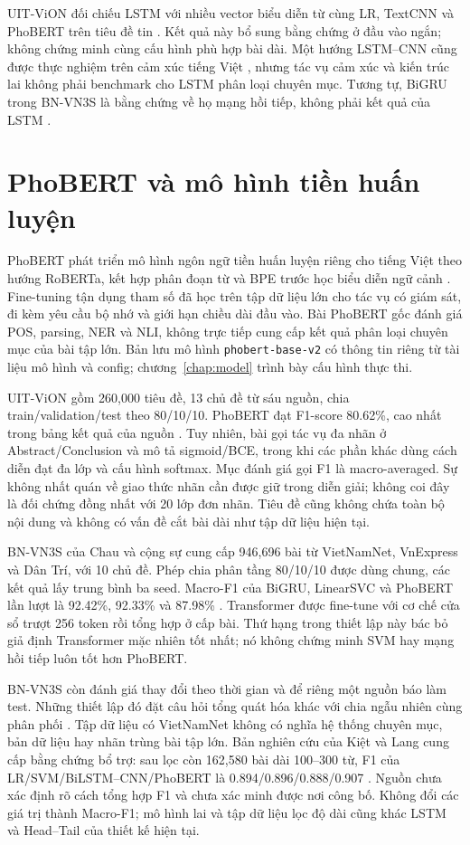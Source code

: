 UIT-ViON đối chiếu LSTM với nhiều vector biểu diễn từ cùng LR, TextCNN và PhoBERT trên tiêu đề tin \citep{tran2021}. Kết quả này bổ sung bằng chứng ở đầu vào ngắn; không chứng minh cùng cấu hình phù hợp bài dài. Một hướng LSTM--CNN cũng được thực nghiệm trên cảm xúc tiếng Việt \citep{vo2017}, nhưng tác vụ cảm xúc và kiến trúc lai không phải benchmark cho LSTM phân loại chuyên mục. Tương tự, BiGRU trong BN-VN3S là bằng chứng về họ mạng hồi tiếp, không phải kết quả của LSTM \citep{chau2026}.

\FloatBarrier
\section{PhoBERT và mô hình tiền huấn luyện}
PhoBERT phát triển mô hình ngôn ngữ tiền huấn luyện riêng cho tiếng Việt theo hướng RoBERTa, kết hợp phân đoạn từ và BPE trước học biểu diễn ngữ cảnh \citep{phobert}. Fine-tuning tận dụng tham số đã học trên tập dữ liệu lớn cho tác vụ có giám sát, đi kèm yêu cầu bộ nhớ và giới hạn chiều dài đầu vào. Bài PhoBERT gốc đánh giá POS, parsing, NER và NLI, không trực tiếp cung cấp kết quả phân loại chuyên mục của bài tập lớn. Bản lưu mô hình \texttt{phobert-base-v2} có thông tin riêng từ tài liệu mô hình và config; chương~\ref{chap:model} trình bày cấu hình thực thi.

UIT-ViON gồm 260,000 tiêu đề, 13 chủ đề từ sáu nguồn, chia train/validation/test theo 80/10/10. PhoBERT đạt F1-score 80.62\%, cao nhất trong bảng kết quả của nguồn \citep{tran2021}. Tuy nhiên, bài gọi tác vụ đa nhãn ở Abstract/Conclusion và mô tả sigmoid/BCE, trong khi các phần khác dùng cách diễn đạt đa lớp và cấu hình softmax. Mục đánh giá gọi F1 là macro-averaged. Sự không nhất quán về giao thức nhãn cần được giữ trong diễn giải; không coi đây là đối chứng đồng nhất với 20 lớp đơn nhãn. Tiêu đề cũng không chứa toàn bộ nội dung và không có vấn đề cắt bài dài như tập dữ liệu hiện tại.

BN-VN3S của Chau và cộng sự cung cấp 946,696 bài từ VietNamNet, VnExpress và Dân Trí, với 10 chủ đề. Phép chia phân tầng 80/10/10 được dùng chung, các kết quả lấy trung bình ba seed. Macro-F1 của BiGRU, LinearSVC và PhoBERT lần lượt là 92.42\%, 92.33\% và 87.98\% \citep{chau2026}. Transformer được fine-tune với cơ chế cửa sổ trượt 256 token rồi tổng hợp ở cấp bài. Thứ hạng trong thiết lập này bác bỏ giả định Transformer mặc nhiên tốt nhất; nó không chứng minh SVM hay mạng hồi tiếp luôn tốt hơn PhoBERT.

BN-VN3S còn đánh giá thay đổi theo thời gian và để riêng một nguồn báo làm test. Những thiết lập đó đặt câu hỏi tổng quát hóa khác với chia ngẫu nhiên cùng phân phối \citep{chau2026}. Tập dữ liệu có VietNamNet không có nghĩa hệ thống chuyên mục, bản dữ liệu hay nhãn trùng bài tập lớn. Bản nghiên cứu của Kiệt và Lang cung cấp bằng chứng bổ trợ: sau lọc còn 162,580 bài dài 100--300 từ, F1 của LR/SVM/BiLSTM--CNN/PhoBERT là 0.894/0.896/0.888/0.907 \citep{kietlang}. Nguồn chưa xác định rõ cách tổng hợp F1 và chưa xác minh được nơi công bố. Không đổi các giá trị thành Macro-F1; mô hình lai và tập dữ liệu lọc độ dài cũng khác LSTM và Head--Tail của thiết kế hiện tại.

